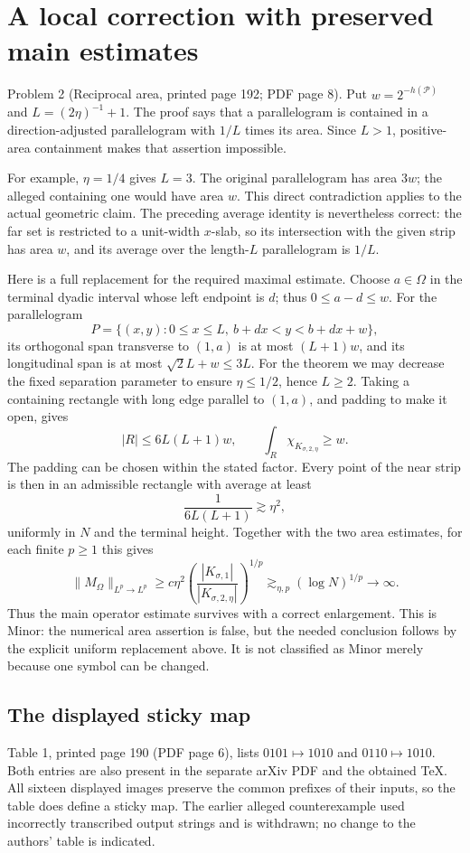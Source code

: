 \documentclass[10pt]{article}
\begin{document}
\section*{A local correction with preserved main estimates}
Problem 2 (Reciprocal area, printed page 192; PDF page 8).  Put \(w=2^{-h(\mathcal P)}\) and \(L=(2\eta)^{-1}+1\). The proof says that a parallelogram is contained in a direction-adjusted parallelogram with \(1/L\) times its area. Since \(L>1\), positive-area containment makes that assertion impossible.\par
For example, \(\eta=1/4\) gives \(L=3\). The original parallelogram has area \(3w\); the alleged containing one would have area \(w\). This direct contradiction applies to the actual geometric claim. The preceding average identity is nevertheless correct: the far set is restricted to a unit-width \(x\)-slab, so its intersection with the given strip has area \(w\), and its average over the length-\(L\) parallelogram is \(1/L\).\par
Here is a full replacement for the required maximal estimate. Choose \(a\in\Omega\) in the terminal dyadic interval whose left endpoint is \(d\); thus \(0\le a-d\le w\). For the parallelogram \[P=\{(x,y):0\le x\le L,\ b+dx<y<b+dx+w\},\] its orthogonal span transverse to \((1,a)\) is at most \((L+1)w\), and its longitudinal span is at most \(\sqrt2L+w\le3L\). For the theorem we may decrease the fixed separation parameter to ensure \(\eta\le1/2\), hence \(L\ge2\). Taking a containing rectangle with long edge parallel to \((1,a)\), and padding to make it open, gives \[|R|\le6L(L+1)w,\qquad
 \int_R\chi_{K_{\sigma,2,\eta}}\ge w.\] The padding can be chosen within the stated factor. Every point of the near strip is then in an admissible rectangle with average at least \[\frac1{6L(L+1)}\gtrsim\eta^2,
 \tag{7}\] uniformly in \(N\) and the terminal height. Together with the two area estimates, for each finite \(p\ge1\) this gives \[\|M_\Omega\|_{L^p\to L^p}
 \ge c\eta^2
 \left(\frac{|K_{\sigma,1}|}{|K_{\sigma,2,\eta}|}\right)^{1/p}
 \gtrsim_{\eta,p}(\log N)^{1/p}\longrightarrow\infty.\] Thus the main operator estimate survives with a correct enlargement. This is Minor: the numerical area assertion is false, but the needed conclusion follows by the explicit uniform replacement above. It is not classified as Minor merely because one symbol can be changed.\par
\subsection*{The displayed sticky map}
Table 1, printed page 190 (PDF page 6), lists \(0101\mapsto1010\) and \(0110\mapsto1010\). Both entries are also present in the separate arXiv PDF and the obtained TeX. All sixteen displayed images preserve the common prefixes of their inputs, so the table does define a sticky map. The earlier alleged counterexample used incorrectly transcribed output strings and is withdrawn; no change to the authors’ table is indicated.\par
\end{document}

